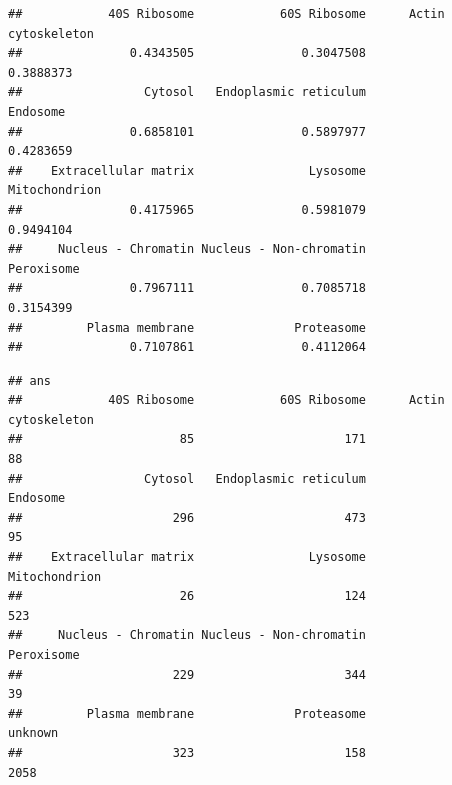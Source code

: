 \begin{knitrout}
\color{fgcolor}\begin{kframe}
\begin{alltt}
 \hlkwb{<-}   \hlstd{=} \hlstd{,}  \hlstd{=} \hlstd{,}  \hlstd{=} \hlstd{,}  \hlstd{=} \hlstd{)}
\end{alltt}
\begin{verbatim}
##            40S Ribosome            60S Ribosome      Actin cytoskeleton 
##               0.4343505               0.3047508               0.3888373 
##                 Cytosol   Endoplasmic reticulum                Endosome 
##               0.6858101               0.5897977               0.4283659 
##    Extracellular matrix                Lysosome           Mitochondrion 
##               0.4175965               0.5981079               0.9494104 
##     Nucleus - Chromatin Nucleus - Non-chromatin              Peroxisome 
##               0.7967111               0.7085718               0.3154399 
##         Plasma membrane              Proteasome 
##               0.7107861               0.4112064
\end{verbatim}
\begin{alltt}
 \hlkwb{<-}   \hlstd{=} \hlstd{,}  \hlstd{=} \hlstd{,}  \hlstd{=} \hlstd{,}  
\end{alltt}
\begin{verbatim}
## ans
##            40S Ribosome            60S Ribosome      Actin cytoskeleton 
##                      85                     171                      88 
##                 Cytosol   Endoplasmic reticulum                Endosome 
##                     296                     473                      95 
##    Extracellular matrix                Lysosome           Mitochondrion 
##                      26                     124                     523 
##     Nucleus - Chromatin Nucleus - Non-chromatin              Peroxisome 
##                     229                     344                      39 
##         Plasma membrane              Proteasome                 unknown 
##                     323                     158                    2058
\end{verbatim}
\end{kframe}
\end{knitrout}

